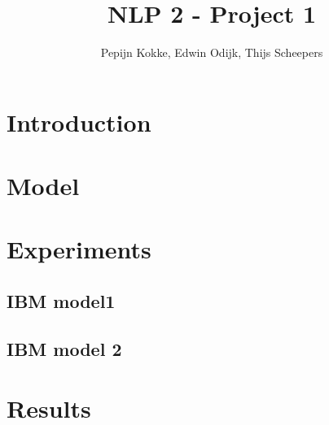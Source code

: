 \documentclass[11pt]{article}
\title{NLP 2 - Project 1}
\author{Pepijn Kokke, Edwin Odijk, Thijs Scheepers}
\date{}
\begin{document}
\maketitle

\begin{abstract}
\end{abstract}

\section{Introduction}

\section{Model}

\section{Experiments}

\subsection{IBM model1}

\subsection{IBM model 2}

\section{Results}
\end{document}
